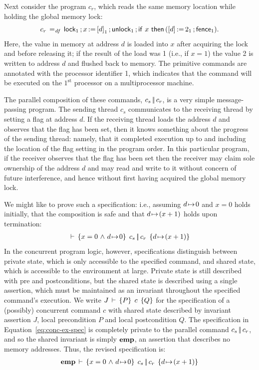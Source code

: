 \documentclass[11pt]{report}
\begin{document}
Next consider the program $c_r$, which reads the same memory location while holding the global memory lock: \[ c_r \operatorname{\;=_{\mathit{df}}\;} \operatorname{\mathsf{lock}}_1 \operatorname{;} x \operatorname{:\!=} \left[ d \right]_1 \operatorname{;} \operatorname{\mathsf{unlock}}_1 \operatorname{;} \operatorname{\mathsf{if\,}} x \operatorname{\mathsf{\,then\,}} (\left[ d \right] \operatorname{:\!=} 2_1 \operatorname{;} \operatorname{\mathsf{fence}}_1).\] Here, the value in memory at address $d$ is loaded into $x$ after acquiring the lock and before releasing it; if the result of the load was 1 (i.e., if $x = 1$) the value 2 is written to address $d$ and flushed back to memory. The primitive commands are annotated with the processor identifier 1, which indicates that the command will be executed on the $1^{\mathrm{st}}$ processor on a multiprocessor machine. 

The parallel composition of these commands, $c_s \operatorname{|\!|} c_r$, is a very simple message-passing program. The sending thread $c_s$ communicates to the receiving thread by setting a flag at address $d$. If the receiving thread loads the address $d$ and observes that the flag has been set, then it knows something about the progress of the sending thread: namely, that it completed execution up to and including the location of the flag setting in the program order. In this particular program, if the receiver observes that the flag has been set then the receiver may claim sole ownership of the address $d$ and may read and write to it without concern of future interference, and hence without first having acquired the global memory lock.

We might like to prove such a specification: i.e., assuming $d \!\mapsto\! 0$ and $x = 0$ holds initially, that the composition is safe and that $d \!\mapsto\! (x+1)$ holds upon termination: \begin{align}
\label{eq:conc-ex-spec} \,\vdash\,\left\lbrace x = 0 \operatorname{\,\wedge\,} d \!\mapsto\! 0 \right\rbrace\;c_s \operatorname{|\!|} c_r\;\left\lbrace d \!\mapsto\! (x+1) \right\rbrace\end{align} In the concurrent program logic, however, specifications distinguish between private state, which is only accessible to the specified command, and shared state, which is accessible to the environment at large. Private state is still described with pre and postconditions, but the shared state is described using a single assertion, which must be maintained as an invariant throughout the specified command's execution. We write $J\,\vdash\,\left\lbrace P \right\rbrace\;c\;\left\lbrace Q \right\rbrace$ for the specification of a (possibly) concurrent command $c$ with shared state described by invariant assertion $J$, local precondition $P$ and local postcondition $Q$. The specification in Equation~\ref{eq:conc-ex-spec} is completely private to the parallel command $c_s \operatorname{|\!|} c_r$, and so the shared invariant is simply $\mathbf{emp}$, an assertion that describes no memory addresses. Thus, the revised specification is: \begin{align}\label{eq:conc-ex-spec-rev} \mathbf{emp}\,\vdash\,\left\lbrace x = 0 \operatorname{\,\wedge\,} d \!\mapsto\! 0 \right\rbrace\;c_s \operatorname{|\!|} c_r\;\left\lbrace d \!\mapsto\! (x+1) \right\rbrace\end{align}
\end{document}
